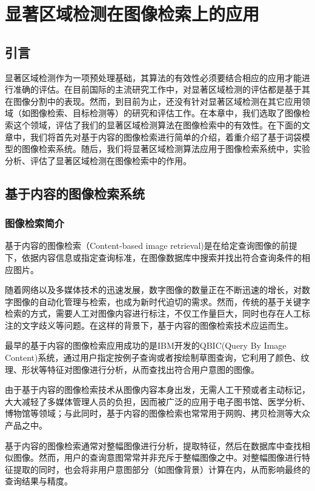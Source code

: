 \chapter{显著区域检测在图像检索上的应用}

\section{引言}
显著区域检测作为一项预处理基础，其算法的有效性必须要结合相应的应用才能进行准确的评估。在目前国际的主流研究工作中，对显著区域检测的评估都是基于其在图像分割中的表现。然而，到目前为止，还没有针对显著区域检测在其它应用领域（如图像检索、目标检测等）的研究和评估工作。在本章中，我们选取了图像检索这个领域，评估了我们的显著区域检测算法在图像检索中的有效性。在下面的文章中，我们将首先对基于内容的图像检索进行简单的介绍，着重介绍了基于词袋模型的图像检索系统。随后，我们将显著区域检测算法应用于图像检索系统中，实验分析、评估了显著区域检测在图像检索中的作用。

\section{基于内容的图像检索系统}

\subsection{图像检索简介}
基于内容的图像检索（Content-based image retrieval)是在给定查询图像的前提下，依据内容信息或指定查询标准，在图像数据库中搜索并找出符合查询条件的相应图片\cite{cyy2007img}。

随着网络以及多媒体技术的迅速发展，数字图像的数量正在不断迅速的增长，对数字图像的自动化管理与检索，也成为新时代迫切的需求。然而，传统的基于关键字检索的方式，需要人工对图像内容进行标注，不仅工作量巨大，同时也存在人工标注的文字歧义等问题。在这样的背景下，基于内容的图像检索技术应运而生。

最早的基于内容的图像检索应用成功的是IBM开发的QBIC\cite{qbic}(Query By Image Content)系统，通过用户指定按例子查询或者按绘制草图查询，它利用了颜色、纹理、形状等特征对图像进行分析，从而查找出符合用户意图的图像。

由于基于内容的图像检索技术从图像内容本身出发，无需人工干预或者主动标记，大大减轻了多媒体管理人员的负担，因而被广泛的应用于电子图书馆、医学分析、博物馆等领域；与此同时，基于内容的图像检索也常常用于网购、拷贝检测等大众产品之中。

基于内容的图像检索通常对整幅图像进行分析，提取特征，然后在数据库中查找相似图像。然而，用户的查询意图常常并非充斥于整幅图像之中。对整幅图像进行特征提取的同时，也会将非用户意图部分（如图像背景）计算在内，从而影响最终的查询结果与精度。


